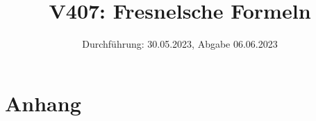 

\title{V407: Fresnelsche Formeln}
\date{Durchführung: 30.05.2023, Abgabe 06.06.2023}


\maketitle
\thispagestyle{empty} 
\tableofcontents
\newpage
\setcounter{page}{1}






\printbibliography
\newpage

\section*{Anhang}

